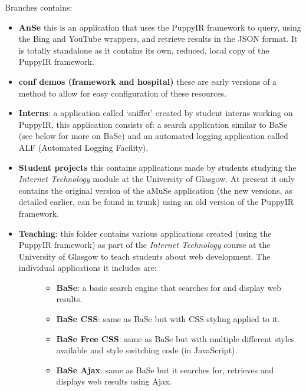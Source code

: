 \documentclass[letterpaper,10pt,english]{sphinxmanual}
\begin{document}
Branches contains:
\begin{itemize}
\item {} 
\textbf{AnSe} this is an application that uses the PuppyIR framework to query, using the Bing and YouTube wrappers, and retrieve results in the JSON format. It is totally standalone as it contains its own, reduced, local copy of the PuppyIR framework.

\item {} 
\textbf{conf demos (framework and hospital)} these are early versions of a method to allow for easy configuration of these resources.

\item {} 
\textbf{Interns}: a application called `sniffer' created by student interns working on PuppyIR, this application consists of: a search application similar to BaSe (see below for more on BaSe) and an automated logging application called ALF (Automated Logging Facility).

\item {} 
\textbf{Student projects} this contains applications made by students studying the \emph{Internet Technology} module at the University of Glasgow. At present it only contains the original version of the aMuSe application (the new versions, as detailed earlier, can be found in trunk) using an old version of the PuppyIR framework.

\item {} \begin{description}
\item[{\textbf{Teaching}: this folder contains various applications created (using the PuppyIR framework) as part of the \emph{Internet Technology} course at the University of Glasgow to teach students about web development. The individual applications it includes are:}] \leavevmode\begin{itemize}
\item {} 
\textbf{BaSe}: a basic search engine that searches for and display web results.

\item {} 
\textbf{BaSe CSS}: same as BaSe but with CSS styling applied to it.

\item {} 
\textbf{BaSe Free CSS}: same as BaSe but with multiple different styles available and style switching code (in JavaScript).

\item {} 
\textbf{BaSe Ajax}: same as BaSe but it searches for, retrieves and displays web results using Ajax.


\end{itemize}
\end{description}
\end{itemize}
\end{document}
